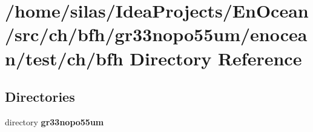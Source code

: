 \section{/home/silas/\+Idea\+Projects/\+En\+Ocean/src/ch/bfh/gr33nopo55um/enocean/test/ch/bfh Directory Reference}
\label{dir_02b0284e631ec60d998d5b75f59ba1d0}
\subsection*{Directories}
\begin{DoxyCompactItemize}
\item 
directory {\bf gr33nopo55um}
\end{DoxyCompactItemize}

